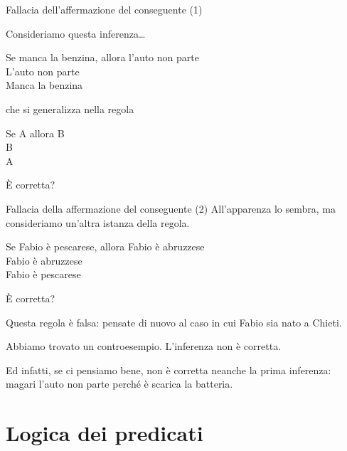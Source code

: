 \documentclass[10pt,dvipsnames,handout]{beamer}
\begin{document}
\begin{frame}{Fallacia dell'affermazione del conseguente (1)}

	Consideriamo questa inferenza\ldots
	\begin{center}
		\begin{inference}
			Se manca la benzina, allora l'auto non parte\\
			L'auto non parte\\
			\hline
			Manca la benzina
		\end{inference}
	\end{center}
	che si generalizza nella regola
	\begin{center}
		\begin{inference}
			Se A allora B\\
			B\\
			\hline
			A
		\end{inference}
	\end{center}
	È corretta?
\end{frame}

\begin{frame}{Fallacia della affermazione del conseguente (2)}
	All'apparenza lo sembra, ma consideriamo un'altra istanza della regola.
	\begin{center}
		\begin{inference}
			Se Fabio è pescarese, allora Fabio è abruzzese\\
			Fabio è abruzzese\\
			\hline
			Fabio è pescarese
		\end{inference}
	\end{center}
	È corretta?

	\pause
	\medskip
	Questa regola è falsa: pensate di nuovo al caso in cui Fabio sia nato a Chieti.

	\medskip
	Abbiamo trovato un \alert{controesempio}. L'inferenza non è corretta.

	\medskip
	Ed infatti, se ci pensiamo bene, non è corretta neanche la prima inferenza: magari l'auto non parte perché è scarica la batteria.
\end{frame}


\section{Logica dei predicati}

\end{document}
